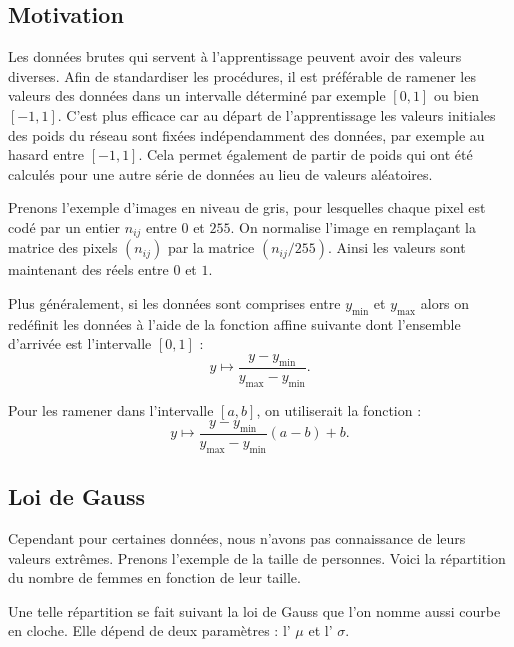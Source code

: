 \documentclass[11pt,class=report,crop=false]{standalone}
\begin{document}

\subsection{Motivation}

Les données brutes qui servent à l'apprentissage peuvent avoir des valeurs diverses.
Afin de standardiser les procédures, il est préférable de ramener les valeurs des données dans un intervalle déterminé par exemple $[0,1]$ ou bien $[-1,1]$. 
C'est plus efficace car au départ de l'apprentissage les valeurs initiales des poids du réseau sont fixées indépendamment des données, par exemple au hasard entre $[-1,1]$.
Cela permet également de partir de poids qui ont été calculés pour une autre série de données au lieu de valeurs aléatoires.

Prenons l'exemple d'images en niveau de gris, pour lesquelles chaque pixel est codé par un entier $n_{ij}$ entre $0$ et $255$. On \og{}normalise\fg{} l'image en remplaçant la matrice des pixels $(n_{ij})$ par la matrice $(n_{ij}/255)$. Ainsi les valeurs sont maintenant des réels entre $0$ et $1$.


Plus généralement, si les données sont comprises entre $y_{\min}$ et $y_{\max}$ alors on redéfinit les données à l'aide de la fonction affine suivante dont l'ensemble d'arrivée est l'intervalle $[0,1]$ : 
$$y \mapsto \frac{y - y_{\min}}{y_{\max} - y_{\min}}.$$ 

Pour les ramener dans l'intervalle $[a,b]$, on utiliserait la fonction :
$$y \mapsto \frac{y - y_{\min}}{y_{\max} - y_{\min}}(a-b) + b.$$


\subsection{Loi de Gauss}

Cependant pour certaines données, nous n'avons pas connaissance de leurs valeurs extrêmes.
Prenons l'exemple de la taille de personnes. Voici la répartition du nombre de femmes en fonction de leur taille.


Une telle répartition se fait suivant la \og{}loi de Gauss\fg{} que l'on nomme aussi \og{}courbe en cloche\fg{}. Elle dépend de deux paramètres : l' $\mu$ et l' $\sigma$.
\end{document}
